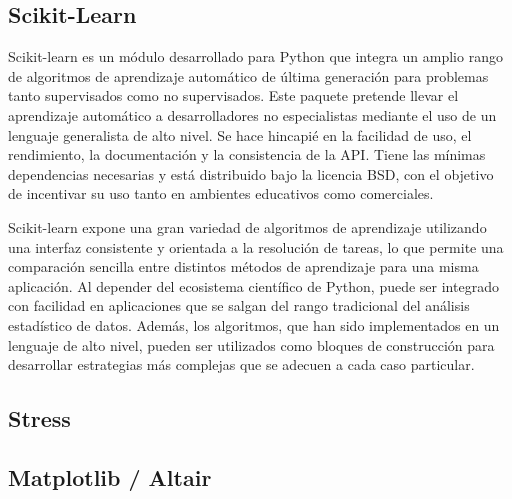 

\subsection{Scikit-Learn}

Scikit-learn es un módulo desarrollado para Python que integra un amplio rango de algoritmos de aprendizaje automático de última generación para problemas tanto supervisados como no supervisados. Este paquete pretende llevar el aprendizaje automático a desarrolladores no especialistas mediante el uso de un lenguaje generalista de alto nivel. Se hace hincapié en la facilidad de uso, el rendimiento, la documentación y la consistencia de la API. Tiene las mínimas dependencias necesarias y está distribuido bajo la licencia BSD, con el objetivo de incentivar su uso tanto en ambientes educativos como comerciales.

Scikit-learn expone una gran variedad de algoritmos de aprendizaje utilizando una interfaz consistente y orientada a la resolución de tareas, lo que permite una comparación sencilla entre distintos métodos de aprendizaje para una misma aplicación. Al depender del ecosistema científico de Python, puede ser integrado con facilidad en aplicaciones que se salgan del rango tradicional del análisis estadístico de datos. Además, los algoritmos, que han sido implementados en un lenguaje de alto nivel, pueden ser utilizados como bloques de construcción para desarrollar estrategias más complejas que se adecuen a cada caso particular.



\subsection{Stress}


\subsection{Matplotlib / Altair}





